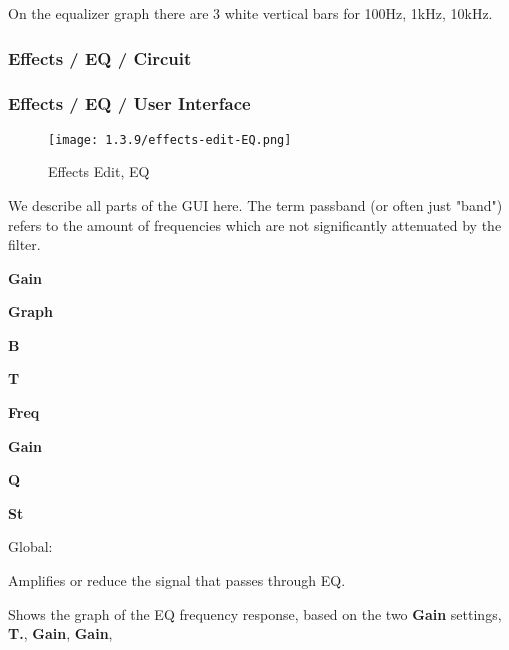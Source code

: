    On the equalizer graph there are 3 white
   vertical bars for 100Hz, 1kHz, 10kHz.

\subsubsection{Effects / EQ / Circuit}
\label{subsubsec:effects_edit_eq_circuit}

%

\subsubsection{Effects / EQ / User Interface}
\label{subsubsec:effects_edit_eq_ui}

\begin{figure}[H]
   \centering
   \texttt{[image: 1.3.9/effects-edit-EQ.png]}
   \caption{Effects Edit, EQ}
   \label{fig:effects_edit_eq}
\end{figure}

   We describe all parts of the GUI here. The term passband (or often just
   "band") refers to the amount of frequencies which are not
   significantly attenuated by the filter.

   \begin{enumber}
      \item \textbf{Gain}
      \item \textbf{Graph}
      \item \textbf{B}
      \item \textbf{T}
      \item \textbf{Freq}
      \item \textbf{Gain}
      \item \textbf{Q}
      \item \textbf{St}
   \end{enumber}

   Global:

   \setcounter{ItemCounter}{0}      %

   Amplifies or reduce the signal that passes through EQ.

   Shows the graph of the EQ frequency response, based on the
   two \textbf{Gain} settings,
   \textbf{T.},
   \textbf{Gain},
   \textbf{Gain},

